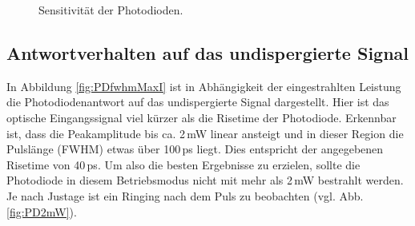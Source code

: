 \documentclass[bachelor,       %
               twoside,        %
               BCOR10mm,       %
               liststotoc,nomtotoc,bibtotoc, %
               english,ngerman, %
               final,          %
               ]{GAUBM}
\begin{document}
\begin{figure}[!htb]
	\centering
   \hfill
	\caption{Sensitivität der Photodioden.}
	\label{fig:PDsens}
\end{figure}

\subsection{Antwortverhalten auf das undispergierte Signal}
In Abbildung \ref{fig:PDfwhmMaxI} ist in Abhängigkeit der eingestrahlten Leistung die Photodiodenantwort auf das undispergierte Signal dargestellt.
Hier ist  das optische Eingangssignal viel kürzer als die Risetime der Photodiode.
Erkennbar ist, dass die Peakamplitude bis ca. 2\,mW linear ansteigt und in dieser Region die Pulslänge (FWHM) etwas über 100\,ps liegt.
Dies entspricht der angegebenen Risetime von 40\,ps.
Um also die besten Ergebnisse zu erzielen, sollte die Photodiode in diesem Betriebsmodus nicht mit mehr als 2\,mW bestrahlt werden.
Je nach Justage ist ein Ringing nach dem Puls zu beobachten (vgl. Abb.\ref{fig:PD2mW}).
\end{document}
